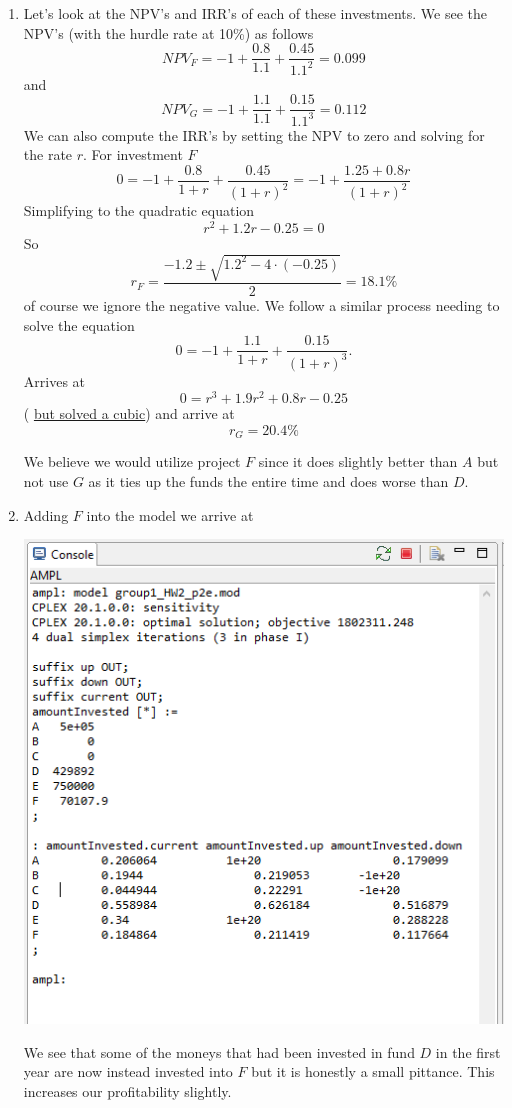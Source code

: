 \documentclass[11pt]{article}
\begin{document}
\begin{enumerate}
\begin{enumerate}
\item Let's look at the NPV's and IRR's of each of these investments.  We see the NPV's (with the hurdle rate at 10\%) as follows
\[
NPV_F = -1+\frac{0.8}{1.1} +\frac{0.45}{1.1^2} = 0.099
\]
and
\[
NPV_G = -1 +\frac{1.1}{1.1} +\frac{0.15}{1.1^3} = 0.112
\]
We can also compute the IRR's by setting the NPV to zero and solving for the rate $r$.  For investment $F$
\[
0 = -1 +\frac{0.8}{1+r} +\frac{0.45}{(1+r)^2} = -1 +\frac{1.25+0.8r}{(1+r)^2}
\]
Simplifying to the quadratic equation
\[
r^2+1.2r-0.25 = 0
\]
So 
\[
r_F = \frac{-1.2\pm\sqrt{1.2^2-4\cdot(-0.25)}}{2} = 18.1\%
\]
of course we ignore the negative value.  We follow a similar process needing to solve the equation
\[
0 = -1 +\frac{1.1}{1+r} +\frac{0.15}{(1+r)^3}.
\]
Arrives at 
\[
0 =r^3+1.9r^2+0.8r-0.25
\]
( \href{https://www.calculatorsoup.com/calculators/algebra/cubicequation.php?a=1\&b=1.9\&c=.8\&d=-.25\&action=solve}{but solved a cubic}) and arrive at
\[
r_G = 20.4\%
\]

We believe we would utilize project $F$ since it does slightly better than $A$ but not use $G$ as it ties up the funds the entire time and does worse than $D$.

\item Adding $F$ into the model we arrive at


\includegraphics[width = .9\textwidth]{output2e.png}

We see that some of the moneys that had been invested in fund $D$ in the first year are now instead invested into $F$ but it is honestly a small pittance.  This increases our profitability slightly.  



\end{enumerate}
\end{enumerate}
\end{document}
